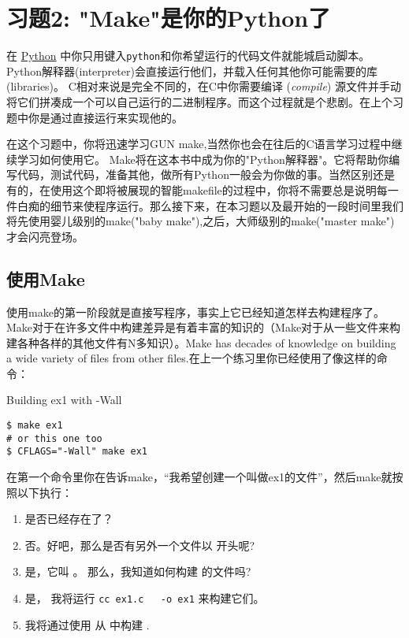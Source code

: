 \chapter{习题2: "Make"是你的Python了}

在 \href{http://learnpythonthehardway.org}{Python} 中你只用键入\verb|python|和你希望运行的代码文件就能城启动脚本。Python解释器(interpreter)会直接运行他们，并载入任何其他你可能需要的库(libraries)。 C相对来说是完全不同的，在C中你需要编译 (\emph{compile}) 源文件并手动将它们拼凑成一个可以自己运行的二进制程序。而这个过程就是个悲剧。在上个习题中你是通过直接运行来实现他的。

在这个习题中，你将迅速学习GUN make,当然你也会在往后的C语言学习过程中继续学习如何使用它。 Make将在这本书中成为你的"Python解释器"。它将帮助你编写代码，测试代码，准备其他，做所有Python一般会为你做的事。当然区别还是有的，在使用这个即将被展现的智能makefile的过程中，你将不需要总是说明每一件白痴的细节来使程序运行。那么接下来，在本习题以及最开始的一段时间里我们将先使用婴儿级别的make("baby make"),之后，大师级别的make("master make")才会闪亮登场。


\section{使用Make}

使用make的第一阶段就是直接写程序，事实上它已经知道怎样去构建程序了。Make对于在许多文件中构建差异是有着丰富的知识的（Make对于从一些文件来构建各种各样的其他文件有N多知识）。Make has decades of knowledge on building
a wide variety of files from other files.在上一个练习里你已经使用了像这样的命令：

\begin{Terminal}{Building ex1 with -Wall}
\begin{lstlisting}
$ make ex1
# or this one too
$ CFLAGS="-Wall" make ex1
\end{lstlisting}
\end{Terminal}

在第一个命令里你在告诉make，“我希望创建一个叫做ex1的文件”，然后make就按照以下执行：

\begin{enumerate}
\item {} 是否已经存在了？
\item 否。好吧，那么是否有另外一个文件以  开头呢?
\item 是，它叫 。 那么，我知道如何构建  的文件吗?
\item 是， 我将运行 \verb|cc ex1.c   -o ex1| 来构建它们。
\item 我将通过使用  从  中构建 .
\end{enumerate}

